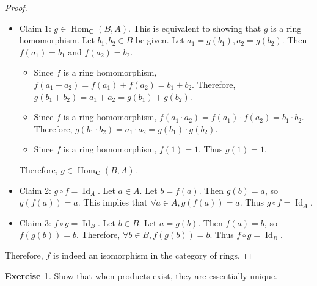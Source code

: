 \documentclass[12pt, psamsfonts]{amsart}
\theoremstyle{definition}
\newtheorem{exer}[thm]{Exercise}
\theoremstyle{remark}
\DeclareMathOperator{\Hom}{Hom}
\DeclareMathOperator{\Id}{Id}
\numberwithin{equation}{section}
\begin{document}
\begin{proof}
\begin{itemize}
  \item
    Claim 1: $g \in \Hom_{\mathbf{C}}(B, A)$.
    This is equivalent to showing that $g$ is a ring homomorphism.
    Let $b_1, b_2 \in B$ be given.
    Let $a_1 = g(b_1), a_2 = g(b_2)$.
    Then $f(a_1) = b_1$ and $f(a_2) = b_2$.
    \begin{itemize}
      \item
        Since $f$ is a ring homomorphism, $f(a_1 + a_2) = f(a_1) + f(a_2) = b_1 + b_2$.
        Therefore, $g(b_1 + b_2) = a_1 + a_2 = g(b_1) + g(b_2)$.
      \item
        Since $f$ is a ring homomorphism, $f(a_1 \cdot a_2) = f(a_1) \cdot f(a_2) = b_1 \cdot b_2$.
        Therefore, $g(b_1 \cdot b_2) = a_1 \cdot a_2 = g(b_1) \cdot g(b_2)$.
      \item
        Since $f$ is a ring homomorphism, $f(1) = 1$.
        Thus $g(1) = 1$.
    \end{itemize}
    Therefore, $g \in \Hom_{\mathbf{C}}(B, A)$.
  \item
    Claim 2: $ g \circ f = \Id_A$.
    Let $a \in A$.
    Let $b = f(a)$.
    Then $g(b) = a$, so $g(f(a)) = a$.
    This implies that $\forall a \in A, g(f(a)) = a$.
    Thus $g \circ f = \Id_A$.
  \item
    Claim 3: $ f \circ g = \Id_B$.
    Let $b \in B$.
    Let $a = g(b)$.
    Then $f(a) = b$, so $f(g(b)) = b$.
    Therefore, $\forall b \in B, f(g(b)) = b$.
    Thus $f \circ g = \Id_B$.
\end{itemize}

Therefore, $f$ is indeed an isomorphism in the category of rings.
\end{proof}

\begin{exer}
  Show that when products exist, they are essentially unique.
\end{exer}
\end{document}
